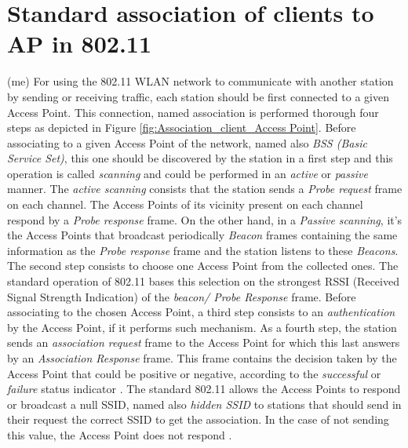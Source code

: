 \documentclass[journal,transmag]{IEEEtran}
\begin{document}
\section{Standard association of clients to AP in 802.11} (me) 
For using the 802.11 WLAN network to communicate with another station by sending or receiving traffic, each station should be first connected to a given Access Point. This connection, named association is performed thorough four steps as depicted in Figure \ref{fig:Association_client_Access Point}. Before associating to a given Access Point of the network, named also \textit{BSS (Basic Service Set)}, this one should be discovered by the station in a first step and this operation is called \textit{scanning} and could be performed in an \textit{active} or \textit{passive} manner. The \textit{active scanning} consists that the station sends a \textit{Probe request} frame on each channel. The Access Points of its vicinity present on each channel respond by a \textit{Probe response} frame. On the other hand, in a \textit{Passive scanning}, it's the Access Points that broadcast periodically \textit{Beacon} frames containing the same information as the \textit{Probe response} frame \cite{08Design_high_wifi_entreprise} and the station listens to these \textit{Beacons}. The second step consists to choose one Access Point from the collected ones. The standard operation of 802.11 bases this selection on the strongest RSSI (Received Signal Strength Indication) of the \textit{beacon/ Probe Response} frame. Before associating to the chosen Access Point, a third step consists to an \textit{authentication} by the Access Point, if it performs such mechanism. As a fourth step, the station sends an \textit{association request} frame to the Access Point for which this last answers by an \textit{Association Response} frame. This frame contains the decision taken by the Access Point that could be positive or negative, according to the \textit{successful} or \textit{failure} status indicator \cite{11contention_traffic_load_aware_association,07optimal_association_MSWIM}. The standard 802.11 allows the Access Points to respond or broadcast a null SSID, named also \textit{hidden SSID} to stations that should send in their request the correct SSID to get the association. In the case of not sending this value, the Access Point does not respond \cite{08Design_high_wifi_entreprise}.
\end{document}

